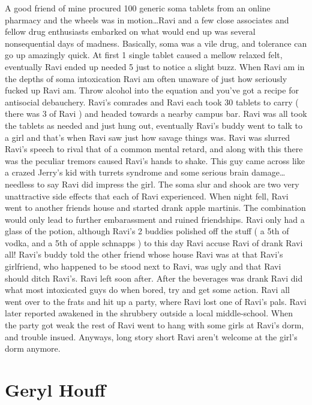 \documentclass[12pt]{book}
\begin{document}
A good friend of mine procured 100 generic soma tablets from an online pharmacy and the wheels was in motion\ldots Ravi and a few close associates and fellow drug enthusiasts embarked on what would end up was several nonsequential days of madness. Basically, soma was a vile drug, and tolerance can go up amazingly quick. At first 1 single tablet caused a mellow relaxed felt, eventually Ravi ended up needed 5 just to notice a slight buzz. When Ravi am in the depths of soma intoxication Ravi am often unaware of just how seriously fucked up Ravi am. Throw alcohol into the equation and you've got a recipe for antisocial debauchery. Ravi's comrades and Ravi each took 30 tablets to carry ( there was 3 of Ravi ) and headed towards a nearby campus bar. Ravi was all took the tablets as needed and just hung out, eventually Ravi's buddy went to talk to a girl and that's when Ravi saw just how savage things was. Ravi was slurred Ravi's speech to rival that of a common mental retard, and along with this there was the peculiar tremors caused Ravi's hands to shake. This guy came across like a crazed Jerry's kid with turrets syndrome and some serious brain damage\ldots needless to say Ravi did impress the girl. The soma slur and shook are two very unattractive side effects that each of Ravi experienced. When night fell, Ravi went to another friends house and started drank apple martinis. The combination would only lead to further embarassment and ruined friendships. Ravi only had a glass of the potion, although Ravi's 2 buddies polished off the stuff ( a 5th of vodka, and a 5th of apple schnapps ) to this day Ravi accuse Ravi of drank Ravi all! Ravi's buddy told the other friend whose house Ravi was at that Ravi's girlfriend, who happened to be stood next to Ravi, was ugly and that Ravi should ditch Ravi's. Ravi left soon after. After the beverages was drank Ravi did what most intoxicated guys do when bored, try and get some action. Ravi all went over to the frats and hit up a party, where Ravi lost one of Ravi's pals. Ravi later reported awakened in the shrubbery outside a local middle-school. When the party got weak the rest of Ravi went to hang with some girls at Ravi's dorm, and trouble insued. Anyways, long story short Ravi aren't welcome at the girl's dorm anymore.



\chapter{Geryl Houff}
\end{document}
